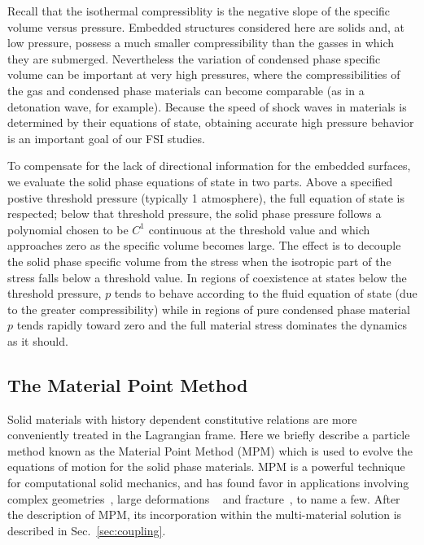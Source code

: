 Recall that the isothermal compressiblity is the negative slope of
the specific volume versus pressure.  Embedded structures considered here are
solids and, at low pressure, possess a much smaller
compressibility than the gasses in which they are submerged.  
Nevertheless the variation of condensed phase specific volume can be important
at very high pressures, where the compressibilities of the gas and condensed
phase materials can become comparable (as in a detonation wave, for
example).  Because the speed of shock waves in materials is determined by
their equations of state, obtaining accurate high pressure behavior is an
important goal of our FSI studies.

To compensate for the lack of directional information for the embedded
surfaces, we evaluate the solid phase equations of state
in two parts.  Above a specified postive threshold pressure 
(typically 1 atmosphere), the full equation of state is respected; below that 
threshold pressure, the solid phase pressure follows a
polynomial chosen to be $C^1$ continuous at the threshold value and
which approaches zero as the specific volume becomes large.  The effect
is to decouple the solid phase specific volume from the stress
when the isotropic part of the stress falls below a threshold value.  In 
regions of coexistence at states below the threshold pressure, $p$ tends 
to behave according to the fluid equation of state (due to the greater 
compressibility) while in regions of pure condensed phase material $p$ tends 
rapidly toward zero and the full material stress dominates the dynamics as 
it should.

\subsection{The Material Point Method}\label{sec:mpm}

Solid materials with history dependent constitutive relations are more 
conveniently treated in the Lagrangian frame.  Here we briefly describe a 
particle method known as the Material Point Method (MPM) which is used to 
evolve the equations of motion for the solid phase materials.  MPM is a 
powerful technique for computational solid mechanics, and has found favor 
in applications involving complex geometries~\cite{Guilkey2006}, large 
deformations ~\cite{Brydon2005} and fracture~\cite{Guo2004}, to name 
a few.  After the description of MPM, its incorporation 
within the multi-material solution is described in 
Sec.~\ref{sec:coupling}.

